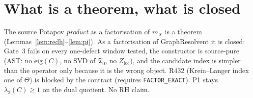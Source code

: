 \documentclass[11pt]{article}
\theoremstyle{remark}
\newcommand{\Tfrak}{\mathfrak{T}}
\begin{document}
\section{What is a theorem, what is closed}\label{sec:honest}

The source Potapov \emph{product} as a factorisation of
$m_X$ is a theorem (Lemmas~\ref{lem:redh}--\ref{lem:pi}).
As a factorisation of GraphResolvent it is closed:
Gate~3 fails on every one-defect window tested, the
constructor is source-pure (AST: no eig$(C)$, no SVD of
$\Tfrak_0$, no $Z_{\mathrm{loc}}$), and the candidate
index is simpler than the operator only because it is
the wrong object.
R432 (Krein--Langer index one of $\Theta$) is blocked by
the contract (requires \texttt{FACTOR\_EXACT}).
P1 stays $\lambda_2(C)\ge 1$ on the dual quotient.
No RH claim.
\end{document}
